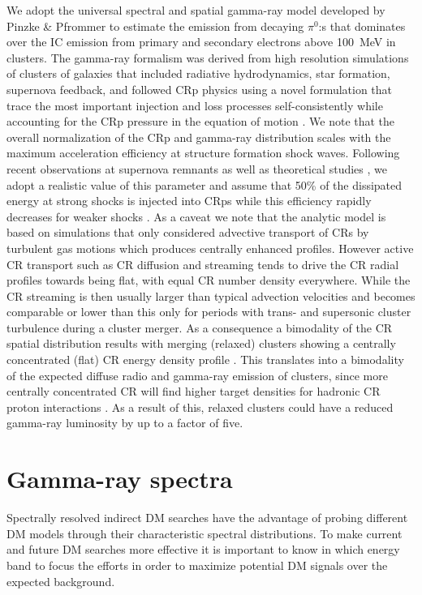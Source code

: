 \documentclass[10pt,aps,pra,reprint,amsmath,amsfonts,amssymb,showpacs,nofootinbib,floatfix]{revtex4-1}
\begin{document}
We adopt the universal spectral and spatial gamma-ray model developed
by Pinzke \& Pfrommer \cite{2010MNRAS.409..449P} to estimate the
emission from decaying $\pi^0$:s that dominates over the IC emission
from primary and secondary electrons above 100~MeV in clusters. The
gamma-ray formalism was derived from high resolution simulations of
clusters of galaxies that included radiative hydrodynamics, star
formation, supernova feedback, and followed CRp physics using a novel
formulation that trace the most important injection and loss processes
self-consistently while accounting for the CRp pressure in the
equation of motion
\cite{2008A&A...481...33J,2007A&A...473...41E,2006MNRAS.367..113P}.
We note that the overall normalization of the CRp and gamma-ray
distribution scales with the maximum acceleration efficiency at
structure formation shock waves. Following recent observations at
supernova remnants \cite{2009Sci...325..719H} as well as theoretical
studies \cite{2005ApJ...620...44K}, we adopt a realistic value of this
parameter and assume that 50\% of the dissipated energy at strong
shocks is injected into CRps while this efficiency rapidly decreases
for weaker shocks \cite{2007A&A...473...41E}. As a caveat we note that
the analytic model is based on simulations that only considered
advective transport of CRs by turbulent gas motions which produces
centrally enhanced profiles. However active CR transport such as CR
diffusion and streaming tends to drive the CR radial profiles towards
being flat, with equal CR number density everywhere. While the CR
streaming is then usually larger than typical advection velocities and
becomes comparable or lower than this only for periods with trans- and
supersonic cluster turbulence during a cluster merger. As a
consequence a bimodality of the CR spatial distribution results with
merging (relaxed) clusters showing a centrally concentrated (flat) CR
energy density profile \cite{2011A&A...527A..99E}.  This translates
into a bimodality of the expected diffuse radio and gamma-ray emission
of clusters, since more centrally concentrated CR will find higher
target densities for hadronic CR proton interactions
\cite{2011A&A...527A..99E}. As a result of this, relaxed clusters
could have a reduced gamma-ray luminosity by up to a factor of five.
 

\section{Gamma-ray spectra}
\label{sect:spectral}
Spectrally resolved indirect DM searches have the advantage of probing
different DM models through their characteristic spectral
distributions. To make current and future DM searches more effective
it is important to know in which energy band to focus the efforts in
order to maximize potential DM signals over the expected background.
\end{document}

